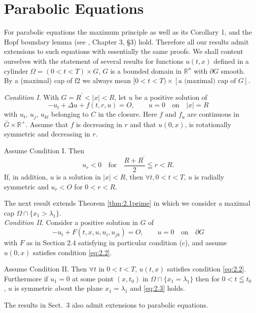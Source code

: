 \section{Parabolic Equations}

For parabolic equations the maximum principle as well as its Corollary 1,
and the Hopf boundary lemma (see \cite{protter_maximum_1984}, Chapter 3, \S 3) hold.
Therefore all our results admit extensions to such equations with essentially the same proofs.
We shall content ourselves with the statement of several results for functions $u(t, x)$ 
defined in a cylinder $\Omega = (0 < t < T) \times G$, $G$ is a bounded domain in $\mathbb{R}^n$ 
with $\partial G$ smooth. 
By a (maximal) cap of f2 we always mean $[0 < t < T) \times [\text{a (maximal) cap of }G]$.

\noindent
\textit{Condition I. }With $G=R^{\prime}< |x| <R$, let $u$ be a positive solution of
\begin{equation}\label{eq:5.1}
	-u_t+\Delta u+f(t,r,u)=O, \qquad u=0 \quad \text{on}\quad |x|=R
\end{equation}
with $u_t$, $u_j$, $u_{kl}$ belonging to $C$ in the closure. Here $f$ and $f_u$ are continuous in $\bar{G}\times\mathbb{R}^+$. Assume that $f$ is decreasing in $r$ and that $u(0, x)$, is rotationally symmetric and decreasing in $r$.
\begin{theorem}\label{thm:5.1}
	Assume Condition I. Then
	\[u_r<0\quad \text{for}\quad \frac{R+R^{\prime}}{2} \leqq r <R.\]
	If, in addition, $u$ is a solution in $|x| <R$, then $\forall t, 0<t<T$, $u$ is radially symmetric and $u_r<O$ for $0<r<R$.
\end{theorem}

The next result extends Theorem \ref{thm:2.1prime} in which we consider a maximal cap $\Omega\cap\{x_1 > \lambda_1 \}$.\\

\noindent
\textit{Condition II. }Consider a positive solution in $G$ of
\[-u_t+F(t,x,u, u_i, u_{jk})=O,\qquad u=0 \quad\text{on}\quad \partial G\]
with $F$ as in Section 2.4 satisfying in particular condition (c), and assume $u(0, x)$ satisfies condition \eqref{eq:2.2}.
\begin{theorem}\label{thm:5.2}
	Assume Condition II. Then $\forall t$ in $0<t<T$, $u(t,x)$ satisfies condition \eqref{eq:2.2}. Furthermore if $u_1=0$ at some point $(x, t_0)$ in $\Omega\cap\{x_1=\lambda_1\}$ then for $0<t\leqq t_0$, $u$ is symmetric about the plane $x_1 =\lambda_1$ and \eqref{eq:2.3} holds.
\end{theorem}

The results in Sect.~3 also admit extensions to parabolic equations.